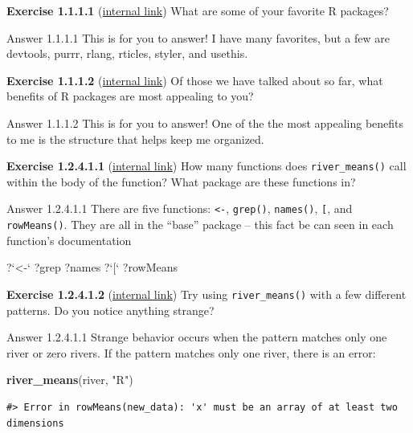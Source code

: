 \documentclass[
]{book}
\newenvironment{Shaded}{\begin{snugshade}}{\end{snugshade}}
\newcommand{\DataTypeTok}[1]{\textcolor[rgb]{0.13,0.29,0.53}{#1}}
\newcommand{\KeywordTok}[1]{\textcolor[rgb]{0.13,0.29,0.53}{\textbf{#1}}}
\newcommand{\NormalTok}[1]{#1}
\newcommand{\StringTok}[1]{\textcolor[rgb]{0.31,0.60,0.02}{#1}}
\begin{document}
\textbf{Exercise 1.1.1.1} (\protect\hyperlink{ex-set1}{internal link})
What are some of your favorite R packages?

Answer 1.1.1.1
This is for you to answer! I have many favorites, but a few are devtools, purrr, rlang, rticles, styler, and usethis.

\textbf{Exercise 1.1.1.2} (\protect\hyperlink{ex-set1}{internal link})
Of those we have talked about so far, what benefits of R packages are most appealing to you?

Answer 1.1.1.2
This is for you to answer! One of the the most appealing benefits to me is the structure that helps keep me organized.

\textbf{Exercise 1.2.4.1.1} (\protect\hyperlink{ex-set2}{internal link})
How many functions does \texttt{river\_means()} call within the body of the function? What package are these functions in?

Answer 1.2.4.1.1
There are five functions: \texttt{\textless{}-}, \texttt{grep()}, \texttt{names()}, \texttt{{[}}, and \texttt{rowMeans()}. They are all in the ``base'' package -- this fact be can seen in each function's documentation

\begin{Shaded}
\begin{Highlighting}[]
\NormalTok{?}\StringTok{`}\DataTypeTok{<-}\StringTok{`}
\NormalTok{?grep}
\NormalTok{?names}
\NormalTok{?}\StringTok{`}\DataTypeTok{[}\StringTok{`}
\NormalTok{?rowMeans}
\end{Highlighting}
\end{Shaded}

\textbf{Exercise 1.2.4.1.2} (\protect\hyperlink{ex-set2}{internal link})
Try using \texttt{river\_means()} with a few different patterns. Do you notice anything strange?

Answer 1.2.4.1.1
Strange behavior occurs when the pattern matches only one river or zero rivers. If the pattern matches only one river, there is an error:

\begin{Shaded}
\begin{Highlighting}[]
\KeywordTok{river_means}\NormalTok{(river, }\StringTok{"R"}\NormalTok{)}
\end{Highlighting}
\end{Shaded}

\begin{verbatim}
#> Error in rowMeans(new_data): 'x' must be an array of at least two dimensions
\end{verbatim}
\end{document}
